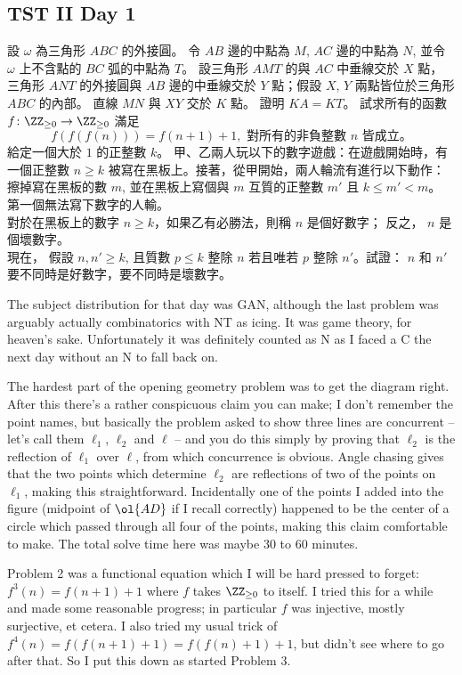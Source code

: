 \documentclass[11pt]{scrreprt}
\begin{document}
\subsection{TST II Day 1}
\begin{enumerate}
  \ii 設 $\omega$ 為三角形 $ABC$ 的外接圓。 令 $AB$ 邊的中點為 $M$, $AC$ 邊的中點為 $N$, 並令 $\omega$ 上不含點的 $BC$ 弧的中點為 $T$。
  設三角形 $AMT$ 的與 $AC$ 中垂線交於 $X$ 點， 三角形 $ANT$ 的外接圓與 $AB$ 邊的中垂線交於 $Y$ 點；假設 $X$, $Y$ 兩點皆位於三角形 $ABC$ 的內部。
  直線 $MN$ 與 $XY$ 交於 $K$ 點。 證明 $KA=KT$。 %
  \ii 試求所有的函數 $f\colon \ZZ_{\ge 0} \to \ZZ_{\ge 0}$ 滿足
  \[ f(f(f(n))) = f(n+1)+1, \text{ 對所有的非負整數 $n$ 皆成立。} \]
  \ii 給定一個大於 $1$ 的正整數 $k$。 甲、乙兩人玩以下的數字遊戲：在遊戲開始時，有一個正整數 $n \ge k$ 被寫在黑板上。接著，從甲開始，兩人輪流有進行以下動作：擦掉寫在黑板的數 $m$, 並在黑板上寫個與 $m$ 互質的正整數 $m'$ 且 $k \le m' < m$。
  第一個無法寫下數字的人輸。 \\
  對於在黑板上的數字 $n \ge k$，如果乙有必勝法，則稱 $n$ 是個好數字； 反之， $n$ 是個壞數字。 \\
  現在， 假設 $n,n' \ge k$, 且質數 $p \le k$ 整除 $n$ 若且唯若 $p$ 整除 $n'$。試證： $n$ 和 $n'$ 要不同時是好數字，要不同時是壞數字。 %
\end{enumerate}
The subject distribution for that day was GAN, although the last problem was arguably actually combinatorics with NT as icing. It was game theory, for heaven's sake. Unfortunately it was definitely counted as N as I faced a C the next day without an N to fall back on.

The hardest part of the opening geometry problem was to get the diagram right. After this there's a rather conspicuous claim you can make; I don't remember the point names, but basically the problem asked to show three lines are concurrent -- let's call them $\ell_1$, $\ell_2$ and $\ell$ -- and you do this simply by proving that $\ell_2$ is the reflection of $\ell_1$ over $\ell$, from which concurrence is obvious. Angle chasing gives that the two points which determine $\ell_2$ are reflections of two of the points on $\ell_1$, making this straightforward. Incidentally one of the points I added into the figure (midpoint of $\ol{AD}$ if I recall correctly) happened to be the center of a circle which passed through all four of the points, making this claim comfortable to make. The total solve time here was maybe 30 to 60 minutes.

Problem 2 was a functional equation which I will be hard pressed to forget: $f^3(n)=f(n+1)+1$ where $f$ takes $\ZZ_{\ge 0}$ to itself. I tried this for a while and made some reasonable progress; in particular $f$ was injective, mostly surjective, et cetera.
I also tried my usual trick of $f^4(n) = f(f(n+1)+1) = f(f(n)+1)+1$, but didn't see where to go after that.
So I put this down as started Problem 3.
\end{document}

